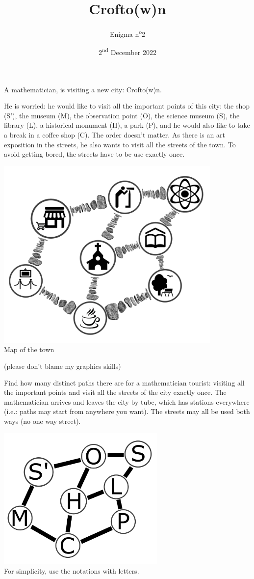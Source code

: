 \documentclass[a4paper, top=10mm]{article}
\title{\textbf{\huge{Crofto(w)n}}}
\author{Enigma n\textsuperscript{o}2}
\date{2\textsuperscript{nd} December 2022}
\begin{document}
	\maketitle
	
	A mathematician, is visiting a new city: Crofto(w)n.
	
	He is worried: he would like to visit all the important points of this city:
	the shop (S'), the museum (M), the observation point (O), the science museum (S), the library (L), a historical monument (H), a park (P), and he would also like to take a break in a coffee shop (C).
	The order doesn't matter. As there is an art exposition in the streets, he also wants to visit all the streets of the town. To avoid getting bored, the streets have to be use exactly once.
	
	\begin{center}
		\includegraphics[height=270pt]{02city.png}\\
		Map of the town
		
		(please don't blame my graphics skills)
	\end{center}
	
	Find how many distinct paths there are for a mathematician tourist: visiting all the important points and visit all the streets of the city exactly once. 
	The mathematician arrives and leaves the city by tube, which has stations everywhere (i.e.: paths may start from anywhere you want).
	The streets may all be used both ways (no one way street).
	
	\begin{center}
		\includegraphics[height=200pt]{02graph.png}\\
		For simplicity, use the notations with letters.
	\end{center}
	
\end{document}

